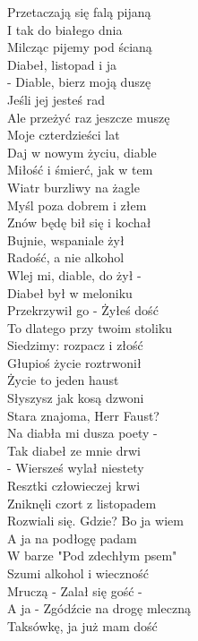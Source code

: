 \begin{flushleft}
Przetaczają się falą pijaną \\
I tak do białego dnia \\
Milcząc pijemy pod ścianą \\
Diabeł, listopad i ja \\
\newpage
- Diable, bierz moją duszę \\
Jeśli jej jesteś rad \\
Ale przeżyć raz jeszcze muszę \\
Moje czterdzieści lat \\
Daj w nowym życiu, diable \\
Miłość i śmierć, jak w tem \\
Wiatr burzliwy na żagle \\
Myśl poza dobrem i złem \\
\vskip 3mm
Znów będę bił się i kochał \\
Bujnie, wspaniale żył \\
Radość, a nie alkohol \\
Wlej mi, diable, do żył - \\
Diabeł był w meloniku \\
Przekrzywił go - Żyłeś dość \\
To dlatego przy twoim stoliku \\
Siedzimy: rozpacz i złość \\
\vskip 3mm
Głupioś życie roztrwonił \\
Życie to jeden haust \\
Słyszysz jak kosą dzwoni  \\
Stara znajoma, Herr Faust? \\
Na diabła mi dusza poety - \\
Tak diabeł ze mnie drwi \\
- Wiersześ wylał niestety \\
Resztki człowieczej krwi \\
\vskip 3mm
Zniknęli czort z listopadem \\
Rozwiali się. Gdzie? Bo ja wiem \\
A ja na podłogę padam \\
W barze "Pod zdechłym psem" \\
Szumi alkohol i wieczność \\
Mruczą - Zalał się gość - \\
A ja - Zgódźcie na drogę mleczną \\
Taksówkę, ja już mam dość \\
\end{flushleft}
\clearpage
